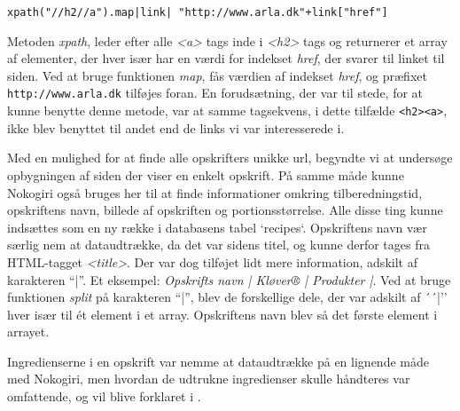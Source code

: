 \texttt{xpath("//h2//a").map{|link| "http://www.arla.dk"+link["href"]}}

Metoden \textit{xpath}, leder efter alle \textit{<a>} tags inde i \textit{<h2>} tags og returnerer et array af elementer, der hver især har en værdi for indekset \textit{href}, der svarer til linket til siden. Ved at bruge funktionen \textit{map}, fås værdien af indekset \textit{href}, og præfixet \texttt{http://www.arla.dk} tilføjes foran. En forudsætning, der var til stede, for at kunne benytte denne metode, var at samme tagsekvens, i dette tilfælde \lstinline{<h2><a>}, ikke blev benyttet til andet end de links vi var interesserede i.

Med en mulighed for at finde alle opskrifters unikke url, begyndte vi at undersøge opbygningen af siden der viser en enkelt opskrift.
På samme måde kunne Nokogiri også bruges her til at finde informationer omkring tilberedningstid, opskriftens navn, billede af opskriften og portionsstørrelse. Alle disse ting kunne indsættes som en ny række i databasens tabel `recipes`. Opskriftens navn vær særlig nem at dataudtrække, da det var sidens titel, og kunne derfor tages fra HTML-tagget \textit{<title>}. Der var dog tilføjet lidt mere information, adskilt af karakteren ``|''. Et eksempel: \textit{Opskrifts navn | Kløver® | Produkter |}. Ved at bruge funktionen \textit{split} på karakteren ``|'', blev de forskellige dele, der var adskilt af ´´|'' hver især til ét element i et array. Opskriftens navn blev så det første element i arrayet.

Ingredienserne i en opskrift var nemme at dataudtrække på en lignende måde med Nokogiri, men hvordan de udtrukne ingredienser skulle håndteres var omfattende, og vil blive forklaret i .

